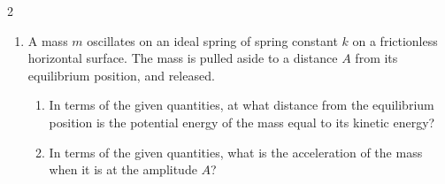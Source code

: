 {\begin{multicols}{2}
\begin{enumerate}[leftmargin=12pt]
  \item A mass $m$ oscillates on an ideal spring of spring constant $k$ on a
    frictionless horizontal surface. The mass is pulled aside to a distance $A$
    from its equilibrium position, and released.
    \begin{center}
    \end{center} 
    \begin{enumerate}[noitemsep]  
    \item In terms of the given quantities, at what distance from the
      equilibrium position is the potential energy of the mass equal to its
      kinetic energy?
    \item In terms of the given quantities, what is the acceleration of the mass
      when it is at the amplitude $A$?
    \end{enumerate}


\end{enumerate}
\end{multicols}}
